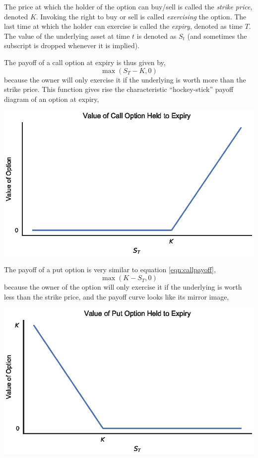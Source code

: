 \documentclass[12pt]{article}
\numberwithin{equation}{section}
\begin{document}
The price at which the holder of the option can buy/sell is called the
\emph{strike price}, denoted $K$. Invoking the right to buy or sell is called
\emph{exercising} the option. The last time at which the holder can exercise is
called the \emph{expiry}, denoted as time $T$. The value of the underlying asset
at time $t$ is denoted as $S_t$ (and sometimes the subscript is dropped whenever
it is implied). 

The payoff of a call option at expiry is thus given by,
\begin{equation}
 \max(S_T - K, 0) 
\label{eqn:callpayoff}
\end{equation}
because the owner will only exercise it if the underlying is worth more than the
strike price. This function gives rise the characteristic ``hockey-stick''
payoff diagram of an option at expiry,

\begin{center}
\includegraphics{figs/calloptpayoff}
\end{center}

The payoff of a put option is very similar to equation \ref{eqn:callpayoff},
\begin{equation}
 \max(K-S_T, 0) 
\end{equation}
because the owner of the option will only exercise it if the underlying is worth
less than the strike price, 
and the payoff curve looks like its mirror image,

\begin{center}
\includegraphics{figs/putoptpayoff}
\end{center}
\end{document}
